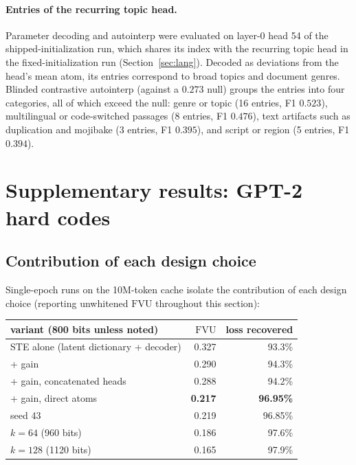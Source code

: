 \paragraph{Entries of the recurring topic head.} Parameter decoding and
autointerp were evaluated on layer-0 head 54 of the
shipped-initialization run, which shares its index with the recurring
topic head in the fixed-initialization run (Section~\ref{sec:lang}).
Decoded as deviations from the head's mean atom, its entries correspond to
broad topics and document genres. Blinded contrastive autointerp (against
a $0.273$ null) groups the entries into four categories, all of which
exceed the null: genre or topic (16 entries, F1 $0.523$), multilingual or
code-switched passages (8 entries, F1 $0.476$), text artifacts such as
duplication and mojibake (3 entries, F1 $0.395$), and script or region (5
entries, F1 $0.394$).

\section{Supplementary results: GPT-2 hard codes}
\label{app:gpt2}

\subsection{Contribution of each design choice}
\label{sec:gpt2ablation}

Single-epoch runs on the 10M-token cache isolate the contribution of each
design choice (reporting unwhitened $\mathrm{FVU}$ throughout this
section):

\begin{center}\small
\begin{tabular}{@{}lrr@{}}
\toprule
variant (800 bits unless noted) & $\mathrm{FVU}$ & loss recovered \\
\midrule
STE alone (latent dictionary + decoder) & 0.327 & 93.3\% \\
+ gain & 0.290 & 94.3\% \\
+ gain, concatenated heads & 0.288 & 94.2\% \\
+ gain, direct atoms & \textbf{0.217} & \textbf{96.95\%} \\
\quad seed 43 & 0.219 & 96.85\% \\
\quad $k{=}64$ (960 bits) & 0.186 & 97.6\% \\
\quad $k{=}128$ (1120 bits) & 0.165 & 97.9\% \\
\bottomrule
\end{tabular}
\end{center}

